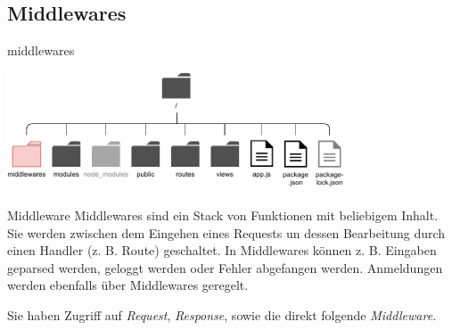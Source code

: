 \subsection{Middlewares}

\begin{bonus}{middlewares}
    \begin{center}
        \includegraphics[width=0.75\textwidth]{includes/figures/bonus_nodejs_middlewares.pdf}
    \end{center}
\end{bonus}

\begin{defi}{Middleware}
    Middlewares sind ein Stack von Funktionen mit beliebigem Inhalt.
    Sie werden zwischen dem Eingehen eines Requests un dessen Bearbeitung durch einen Handler (z. B. Route) geschaltet.
    In Middlewares können z. B. Eingaben geparsed werden, geloggt werden oder Fehler abgefangen werden.
    Anmeldungen werden ebenfalls über Middlewares geregelt.

    Sie haben Zugriff auf \emph{Request}, \emph{Response}, sowie die direkt folgende \emph{Middleware}.
\end{defi}

